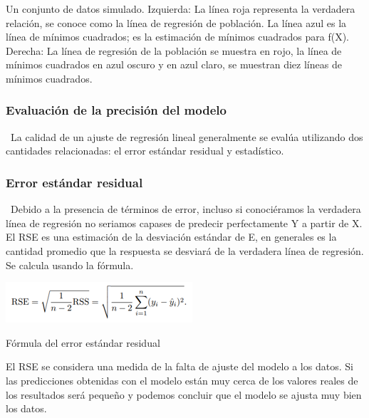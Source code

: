 \documentclass[
  letterpaper,
  DIV=11,
  numbers=noendperiod]{scrartcl}
\begin{document}
Un conjunto de datos simulado. Izquierda: La línea roja representa la
verdadera relación, se conoce como la línea de regresión de población.
La línea azul es la línea de mínimos cuadrados; es la estimación de
mínimos cuadrados para f(X). Derecha: La línea de regresión de la
población se muestra en rojo, la línea de mínimos cuadrados en azul
oscuro y en azul claro, se muestran diez líneas de mínimos cuadrados.

\hypertarget{evaluaciuxf3n-de-la-precisiuxf3n-del-modelo-2}{%
\subsubsection{\texorpdfstring{\textbf{Evaluación de la precisión del
modelo}}{Evaluación de la precisión del modelo}}\label{evaluaciuxf3n-de-la-precisiuxf3n-del-modelo-2}}

~La calidad de un ajuste de regresión lineal generalmente se evalúa
utilizando dos cantidades relacionadas: el error estándar residual y
estadístico.

\hypertarget{error-estuxe1ndar-residual}{%
\subsubsection{\texorpdfstring{\textbf{Error estándar
residual}}{Error estándar residual}}\label{error-estuxe1ndar-residual}}

~Debido a la presencia de términos de error, incluso si conociéramos la
verdadera línea de regresión no seriamos capases de predecir
perfectamente Y a partir de X. El RSE es una estimación de la desviación
estándar de E, en generales es la cantidad promedio que la respuesta se
desviará de la verdadera línea de regresión. Se calcula usando la
fórmula.

\begin{Fórmula del error estándar residual}

{\centering \includegraphics{f3.png}

}

\caption{Fórmula del error estándar residual}

\end{Fórmula del error estándar residual}

El RSE se considera una medida de la falta de ajuste del modelo a los
datos. Si las predicciones obtenidas con el modelo están muy cerca de
los valores reales de los resultados será pequeño y podemos concluir que
el modelo se ajusta muy bien los datos.
\end{document}
